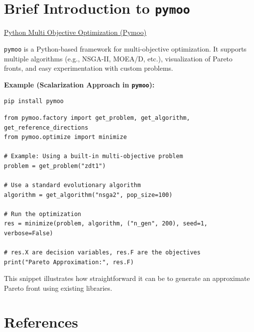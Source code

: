 \section{Brief Introduction to \texttt{pymoo}}
\label{sec:pymoo}

\begin{resource}
\href{https://pymoo.org/}{Python Multi Objective Optimization (Pymoo)}
\end{resource}

\texttt{pymoo} is a Python-based framework for multi-objective optimization. It supports multiple algorithms (e.g., NSGA-II, MOEA/D, etc.), visualization of Pareto fronts, and easy experimentation with custom problems.

\medskip
\noindent
\textbf{Example (Scalarization Approach in \texttt{pymoo}):}
\begin{verbatim}
pip install pymoo
\end{verbatim}

\begin{verbatim}
from pymoo.factory import get_problem, get_algorithm, get_reference_directions
from pymoo.optimize import minimize

# Example: Using a built-in multi-objective problem
problem = get_problem("zdt1")

# Use a standard evolutionary algorithm
algorithm = get_algorithm("nsga2", pop_size=100)

# Run the optimization
res = minimize(problem, algorithm, ("n_gen", 200), seed=1, verbose=False)

# res.X are decision variables, res.F are the objectives
print("Pareto Approximation:", res.F)
\end{verbatim}

This snippet illustrates how straightforward it can be to generate an approximate Pareto front using existing libraries.

\section{References}

